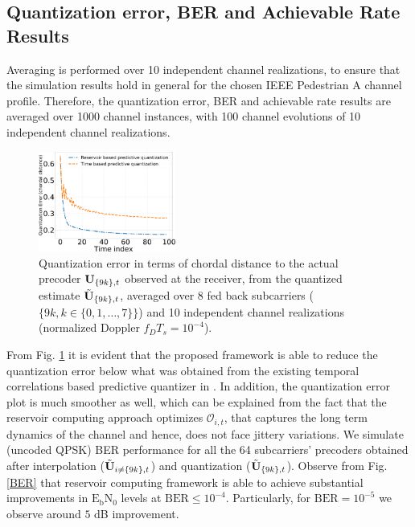 \documentclass[conference]{IEEEtran}
\begin{document}
\subsection{Quantization error, BER and Achievable Rate Results}
\label{res}{}
\noindent Averaging is performed over 10 independent channel realizations, to ensure that the simulation results hold in general for the chosen IEEE Pedestrian A channel profile. Therefore, the quantization error, BER and achievable rate results are averaged over 1000 channel instances, with 100 channel evolutions of 10 independent channel realizations.
\begin{figure}[h]
\centering
\includegraphics[width=0.4\textwidth]{images/qtizErr.pdf}
\caption{Quantization error in terms of chordal distance to the actual precoder ${\bf U}_{\{9k\},t}$ observed at the receiver, from the quantized estimate $\tilde{{\bf U}}_{\{9k\},t}$, averaged over 8 fed back subcarriers ($\{9k, k \in \{0,1,\ldots,7\}\}$) and 10 independent channel realizations (normalized Doppler $f_DT_s=10^{-4}$).}
\label{qtiz_err}
\end{figure}

From Fig. \ref{qtiz_err} it is evident that the proposed framework is able to reduce the quantization error below what was obtained from the existing temporal correlations based predictive quantizer in \cite{6891198}. In addition, the quantization error plot is much smoother as well, which can be explained from the fact that the reservoir computing approach optimizes $\mathcal{O}_{i,t}$, that captures the long term dynamics of the channel and hence, does not face jittery variations. We simulate (uncoded QPSK) BER performance for all the 64 subcarriers' precoders obtained after interpolation ($\tilde{{\bf U}}_{i\neq\{9k\},t}$) and quantization ($\tilde{{\bf U}}_{\{9k\},t}$). Observe from Fig. \ref{BER} that reservoir computing framework is able to achieve substantial improvements in $\text{E}_\text{b}\text{N}_0$ levels at $\text{BER}\leq 10^{-4}$. Particularly, for $\text{BER}=10^{-5}$ we observe around $5$ dB improvement. 
\end{document}
